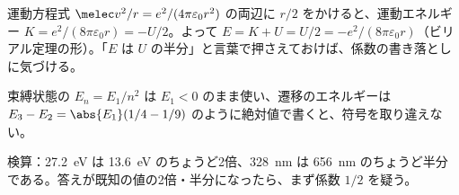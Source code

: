 \begin{rikai}
  \item 運動方程式 $\melec v^{2}/r=e^{2}/(4\pi\varepsilon_{0}r^{2})$ の両辺に $r/2$ をかけると、運動エネルギー $K=e^{2}/(8\pi\varepsilon_{0}r)=-U/2$。よって $E=K+U=U/2=-e^{2}/(8\pi\varepsilon_{0}r)$（ビリアル定理の形）。「$E$ は $U$ の半分」と言葉で押さえておけば、係数の書き落としに気づける。
  \item 束縛状態の $E_{n}=E_{1}/n^{2}$ は $E_{1}<0$ のまま使い、遷移のエネルギーは $E_{3}-E_{2}=\abs{E_{1}}(1/4-1/9)$ のように絶対値で書くと、符号を取り違えない。
  \item 検算：\qty{27.2}{\electronvolt} は \qty{13.6}{\electronvolt} のちょうど2倍、\qty{328}{\nano\metre} は \qty{656}{\nano\metre} のちょうど半分である。答えが既知の値の2倍・半分になったら、まず係数 $1/2$ を疑う。
\end{rikai}
